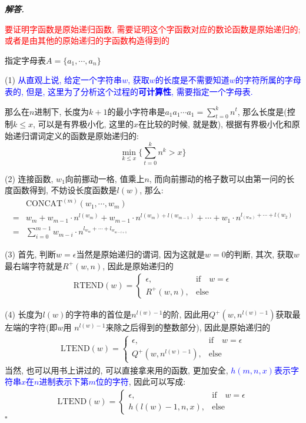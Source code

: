 \documentclass[10pt, a4paper, oneside]{ctexart}
\newenvironment{solution}{%
  \par\noindent\textbf{\textit{解答. }}\ignorespaces
}{%
  \hfill\ensuremath{\square}\par
}
\begin{document}
\begin{solution}
\textcolor{red}{要证明字函数是原始递归函数, 需要证明这个字函数对应的数论函数是原始递归的; 或者是由其他的原始递归的字函数构造得到的}

指定字母表$A=\{a_1,\cdots,a_n\}$

(1) \textcolor{blue}{从直观上说, 给定一个字符串$w$, 获取$w$的长度是不需要知道$w$的字符所属的字母表的, 但是, 这里为了分析这个过程的\textbf{可计算性}, 需要指定一个字母表.}

那么在$n$进制下, 长度为$k+1$的最小字符串是$a_1a_1\cdots a_1=\sum_{t=0}^k n^{t}$, 那么长度是(控制$k\leq x$, 可以是有界极小化, 这里的$x$在比较的时候, 就是数), 根据有界极小化和原始递归谓词定义的函数是原始递归的:
$$\min_{ k\leq x } \{\sum_{t=0}^k n^k > x \} $$

(2) 连接函数, $w_1$向前挪动一格, 值乘上$n$, 而向前挪动的格子数可以由第一问的长度函数得到, 不妨设长度函数是$l(w)$, 那么: 
\begin{align*}
    &\text{CONCAT}^{(m)}(w_1,\cdots,w_m)\\
    =& w_m + w_{m-1}\cdot n^{l(w_m)}+ w_{m-1}\cdot n^{l(w_m)+l(w_{m-1})}+\cdots+w_1\cdot n^{l_(w_m)+\cdots+l(w_2)}\\
    =& \sum_{i=0}^{m-1} w_{m-i}\cdot n^{l_{w_m}+\cdots+l_{w_{m-i+1}}}
\end{align*}

(3) 首先, 判断$w=\epsilon$当然是原始递归的谓词, 因为这就是$w=0$的判断, 其次, 获取$w$最右端字符就是$R^{+}(w,n)$, 因此是原始递归的 
\begin{align*}
    \text{RTEND}(w)=\begin{cases}
        \epsilon, &\text{if} \quad w=\epsilon\\
        R^+(w,n), &\text{else} 
    \end{cases}
\end{align*}

(4) 长度为$l(w)$的字符串的首位是$n^{l(w)-1}$的阶, 因此用$Q^+(w,n^{l(w)-1})$获取最左端的字符(即$w$用 $n^{l(w)-1}$来除之后得到的整数部分), 因此是原始递归的 
\begin{align*}
    \text{LTEND}(w)=\begin{cases}
        \epsilon, &\text{if} \quad w=\epsilon\\
        Q^+(w,n^{l(w)-1}), &\text{else} 
    \end{cases}
\end{align*}
当然, 也可以用书上讲过的, 可以直接拿来用的函数, 更加安全, \textcolor{blue}{$h(m,n,x)$表示字符串$x$在$n$进制表示下第$m$位的字符}, 因此可以写成:
\begin{align*}
    \text{LTEND}(w)=\begin{cases}
        \epsilon, &\text{if} \quad w=\epsilon\\
        h(l(w)-1,n,x), &\text{else} 
    \end{cases}
\end{align*}
\end{solution}
\end{document}
